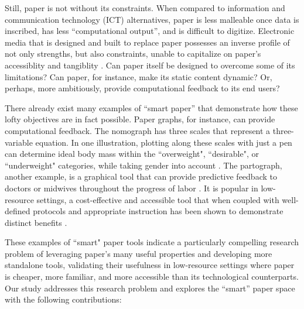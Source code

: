 \documentclass{sig-alternate}
\begin{document}
Still, paper is not without its constraints. When compared to information and communication technology (ICT) alternatives, paper is less malleable once data is inscribed, has less ``computational output'', and is difficult to digitize. Electronic media that is designed and built to replace paper possesses an inverse profile of not only strengths, but also constraints, unable to capitalize on paper's accessiblity and tangiblity \cite{johnson1993}. Can paper itself be designed to overcome some of its limitations? Can paper, for instance, make its static content dynamic? Or, perhaps, more ambitiously, provide computational feedback to its end users?

There already exist many examples of ``smart paper'' that demonstrate how these lofty objectives are in fact possible. Paper graphs, for instance, can provide computational feedback. The nomograph has three scales that represent a three-variable equation. In one illustration, plotting along these scales with just a pen can determine ideal body mass within the ``overweight", ``desirable", or ``underweight" categories, while taking gender into account \cite{thomas1976}. The partograph, another example, is a graphical tool that can provide predictive feedback to doctors or midwives throughout the progress of labor \cite{who1988}. It is popular in low-resource settings, a cost-effective and accessible tool that when coupled with well-defined protocols and appropriate instruction has been shown to demonstrate distinct benefits \cite{fawole2009, umezulike1999, fahdy2005, pettersson2000}.

These examples of ``smart" paper tools indicate a particularly compelling research problem of leveraging paper's many useful properties and developing more standalone tools, validating their usefulness in low-resource settings where paper is cheaper, more familiar, and more accessible than its technological counterparts. Our study addresses this research problem and explores the ``smart'' paper space with the following contributions:
\end{document}
